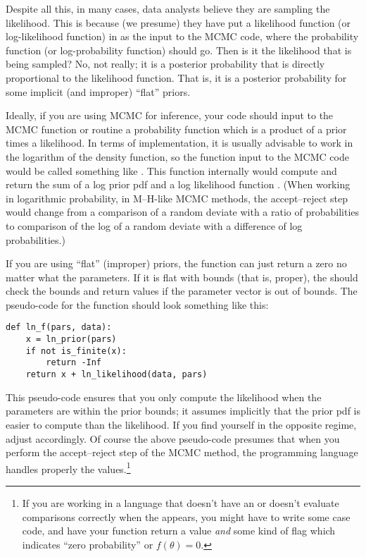 \documentclass[12pt,twoside,pdftex]{article}
\newcommand{\pars}{\theta}
\begin{document}
Despite all this, in many cases,
  data analysts believe they are sampling the likelihood.
This is because (we presume) they have put a likelihood function
  (or log-likelihood function)
  in as the input to the MCMC code, where the probability function
  (or log-probability function) should go.
Then is it the likelihood that is being sampled?
No, not really;
  it is a posterior probability that is directly proportional to the likelihood function.
That is, it is a posterior probability for some implicit (and improper) ``flat'' priors.


Ideally, if you are using MCMC for inference, your code should input
to the MCMC function or routine a probability function which is a
product of a prior times a likelihood.
In terms of implementation, it is usually advisable to work in the
logarithm of the density function, so the function input to the MCMC code
would be called something like .
This function  internally would compute and return the
sum of a log prior pdf  and a log likelihood function
.
(When working in logarithmic probability, in M--H-like MCMC methods,
the accept--reject step would change from a comparison of a random
deviate with a ratio of probabilities to comparison of the log of a
random deviate with a difference of log probabilities.)

If you are using ``flat'' (improper) priors, the 
function can just return a zero no matter what the parameters.
If it is flat with bounds (that is, proper), the 
should check the bounds and return  values if the parameter
vector is out of bounds.
The pseudo-code for the  function should look something
like this:
\begin{verbatim}
def ln_f(pars, data):
    x = ln_prior(pars)
    if not is_finite(x):
        return -Inf
    return x + ln_likelihood(data, pars)
\end{verbatim}
This pseudo-code ensures that you only compute the likelihood when the
parameters are within the prior bounds; it assumes implicitly that the
prior pdf is easier to compute than the likelihood.
If you find yourself in the opposite regime, adjust accordingly.
Of course the above pseudo-code presumes that when you perform the
accept--reject step of the MCMC method, the programming language handles
properly the  values.\footnote{If you are working in a language
that doesn't have an  or doesn't evaluate comparisons correctly
when the  appears, you might have to write some case code, and
have your  function return a value \emph{and} some kind of flag
which indicates ``zero probability'' or $f(\pars)=0$.}
\end{document}
